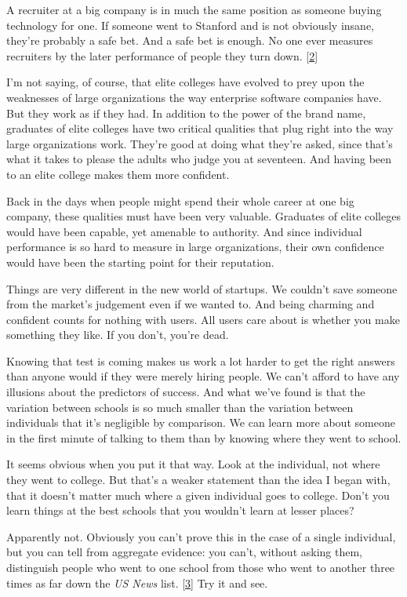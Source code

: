 A recruiter at a big company is in much the same position as someone
buying technology for one. If someone went to Stanford and is not
obviously insane, they're probably a safe bet. And a safe bet is enough.
No one ever measures recruiters by the later performance of people they
turn down. {[}\hyperref[f2n]{2}{]}

I'm not saying, of course, that elite colleges have evolved to prey upon
the weaknesses of large organizations the way enterprise software
companies have. But they work as if they had. In addition to the power
of the brand name, graduates of elite colleges have two critical
qualities that plug right into the way large organizations work. They're
good at doing what they're asked, since that's what it takes to please
the adults who judge you at seventeen. And having been to an elite
college makes them more confident.

Back in the days when people might spend their whole career at one big
company, these qualities must have been very valuable. Graduates of
elite colleges would have been capable, yet amenable to authority. And
since individual performance is so hard to measure in large
organizations, their own confidence would have been the starting point
for their reputation.

Things are very different in the new world of startups. We couldn't save
someone from the market's judgement even if we wanted to. And being
charming and confident counts for nothing with users. All users care
about is whether you make something they like. If you don't, you're
dead.

Knowing that test is coming makes us work a lot harder to get the right
answers than anyone would if they were merely hiring people. We can't
afford to have any illusions about the predictors of success. And what
we've found is that the variation between schools is so much smaller
than the variation between individuals that it's negligible by
comparison. We can learn more about someone in the first minute of
talking to them than by knowing where they went to school.

It seems obvious when you put it that way. Look at the individual, not
where they went to college. But that's a weaker statement than the idea
I began with, that it doesn't matter much where a given individual goes
to college. Don't you learn things at the best schools that you wouldn't
learn at lesser places?

Apparently not. Obviously you can't prove this in the case of a single
individual, but you can tell from aggregate evidence: you can't, without
asking them, distinguish people who went to one school from those who
went to another three times as far down the \emph{US News} list.
{[}\hyperref[f3n]{3}{]} Try it and see.

